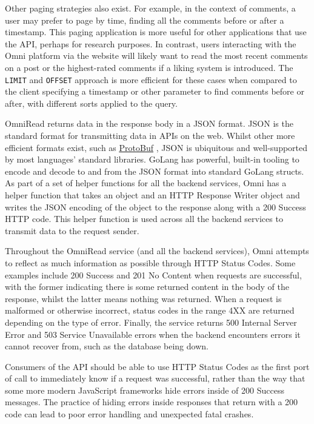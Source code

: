 Other paging strategies also exist. For example, in the context of comments, a user may prefer to page by time, finding all the comments before or after a timestamp.
This paging application is more useful for other applications that use the API, perhaps for research purposes.
In contrast, users interacting with the Omni platform via the website will likely want to read the most recent comments on a post or the highest-rated comments if a liking system is introduced.
The \verb|LIMIT| and \verb|OFFSET| approach is more efficient for these cases when compared to the client specifying a timestamp or other parameter to find comments before or after, with different sorts applied to the query. 

OmniRead returns data in the response body in a JSON format. JSON is the standard format for transmitting data in APIs on the web.
Whilst other more efficient formats exist, such as \underline{\href{https://protobuf.dev}{ProtoBuf}} \nocite{protobuf}, JSON is ubiquitous and well-supported by most languages' standard libraries.
GoLang has powerful, built-in tooling to encode and decode to and from the JSON format into standard GoLang structs.
As part of a set of helper functions for all the backend services, Omni has a helper function that takes an object and an HTTP Response Writer object and writes the JSON encoding of the object to the response along with a 200 Success HTTP code.
This helper function is used across all the backend services to transmit data to the request sender. 

Throughout the OmniRead service (and all the backend services), Omni attempts to reflect as much information as possible through HTTP Status Codes.
Some examples include 200 Success and 201 No Content when requests are successful, with the former indicating there is some returned content in the body of the response, whilst the latter means nothing was returned.
When a request is malformed or otherwise incorrect, status codes in the range 4XX are returned depending on the type of error.
Finally, the service returns 500 Internal Server Error and 503 Service Unavailable errors when the backend encounters errors it cannot recover from, such as the database being down. 

Consumers of the API should be able to use HTTP Status Codes as the first port of call to immediately know if a request was successful, rather than the way that some more modern JavaScript frameworks hide errors inside of 200 Success messages.
The practice of hiding errors inside responses that return with a 200 code can lead to poor error handling and unexpected fatal crashes.
